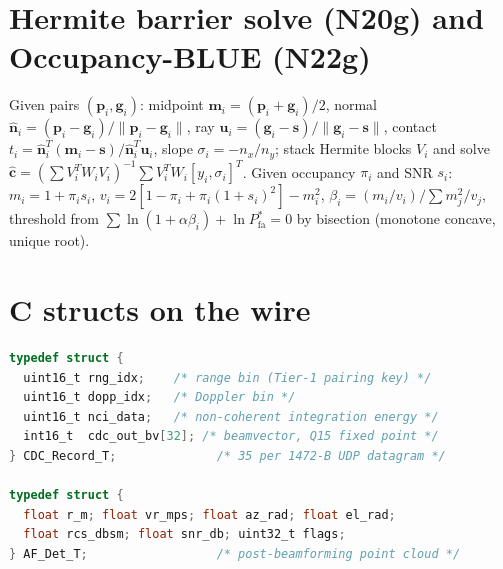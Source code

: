 \documentclass[11pt,oneside]{book}
\begin{document}
\begin{algorithm}[H]
\SetAlgoLined
{}
\caption{Blelloch scan: $O(\log N)$ span. Operand order is load-bearing
for the non-commutative $\otimes$.}
\end{algorithm}

\section{Hermite barrier solve (N20g) and Occupancy-BLUE (N22g)}
\label{sec:alg-frontier}

Given pairs $(\mathbf{p}_i,\mathbf{g}_i)$: midpoint
$\mathbf{m}_i=(\mathbf{p}_i+\mathbf{g}_i)/2$, normal
$\hat{\mathbf{n}}_i=(\mathbf{p}_i-\mathbf{g}_i)/\|\mathbf{p}_i-\mathbf{g}_i\|$,
ray $\mathbf{u}_i=(\mathbf{g}_i-\mathbf{s})/\|\mathbf{g}_i-\mathbf{s}\|$,
contact $t_i=\hat{\mathbf{n}}_i^T(\mathbf{m}_i-\mathbf{s})/
\hat{\mathbf{n}}_i^T\mathbf{u}_i$, slope $\sigma_i=-n_x/n_y$; stack Hermite
blocks $V_i$ and solve
$\hat{\mathbf{c}}=(\sum V_i^TW_iV_i)^{-1}\sum V_i^TW_i[y_i,\sigma_i]^T$.
Given occupancy $\pi_i$ and SNR $s_i$: $m_i=1+\pi_is_i$,
$v_i=2[1-\pi_i+\pi_i(1+s_i)^2]-m_i^2$,
$\beta_i=(m_i/v_i)/\sum m_j^2/v_j$, threshold from
$\sum\ln(1+\alpha\beta_i)+\ln P_{\mathrm{fa}}^*=0$ by bisection
(monotone concave, unique root).

\section{C structs on the wire}
\label{sec:structs}

\begin{lstlisting}[language=C,caption={CDC record and detection stream (simplified).}]
typedef struct {
  uint16_t rng_idx;    /* range bin (Tier-1 pairing key) */
  uint16_t dopp_idx;   /* Doppler bin */
  uint16_t nci_data;   /* non-coherent integration energy */
  int16_t  cdc_out_bv[32]; /* beamvector, Q15 fixed point */
} CDC_Record_T;              /* 35 per 1472-B UDP datagram */

typedef struct {
  float r_m; float vr_mps; float az_rad; float el_rad;
  float rcs_dbsm; float snr_db; uint32_t flags;
} AF_Det_T;                  /* post-beamforming point cloud */
\end{lstlisting}
\end{document}
